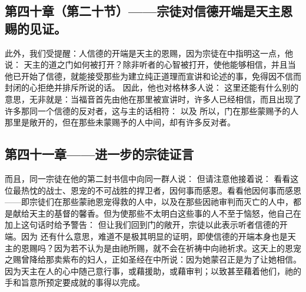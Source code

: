 
\subsection{第四十章（第二十节）——宗徒对信德开端是天主恩赐的见证。}

此外，我们受提醒：人信德的开端是天主的恩赐，因为宗徒在中指明这一点，他说： 天主的道之门如何被打开？除非听者的心智被打开，使他能够相信，并且当他已开始了信德，就能接受那些为建立纯正道理而宣讲和论述的事，免得因不信而封闭的心拒绝并排斥所说的话。 因此，他也对格林多人说： 这里还能有什么别的意思，无非就是：当福音首先由他在那里被宣讲时，许多人已经相信，而且出现了许多那同一个信德的反对者，这与主的话相符： 以及 所以，门在那些蒙赐予的人那里是敞开的，但在那些未蒙赐予的人中间，却有许多反对者。\par


\subsection{第四十一章——进一步的宗徒证言}

而且，同一宗徒在他的第二封书信中向同一群人说： 但请注意他接着说： 看看这位最热忱的战士、恩宠的不可战胜的捍卫者，因何事而感恩。看看他因何事而感恩——即宗徒们在那些蒙祂恩宠得救的人中，以及在那些因祂审判而灭亡的人中，都是献给天主的基督的馨香。但为使那些不太明白这些事的人不至于恼怒，他自己在加上这句话时给予警告： 但让我们回到门的敞开，宗徒以此表示听者信德的开端。因为 还有什么意思，难道不是极其明显的证明，即使信德的开端本身也是天主的恩赐吗？因为若不认为是由祂所赐，就不会在祈祷中向祂祈求。这天上的恩宠之赐曾降给那卖紫布的妇人，正如圣经在中所说：因为她蒙召正是为了让她相信。因为天主在人的心中随己意行事，或藉援助，或藉审判；以致甚至藉着他们，祂的手和旨意所预定要成就的事得以完成。\par

